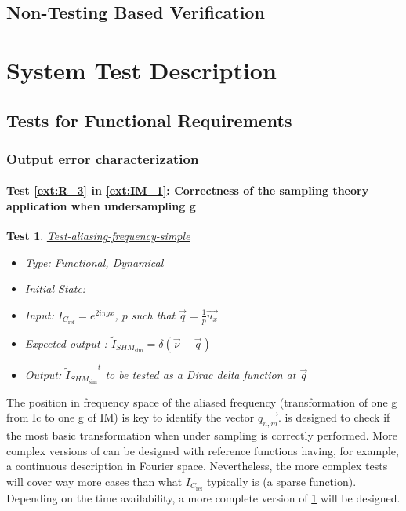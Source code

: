\documentclass[12pt, titlepage]{article}
\newtheorem{Test}{Test}
\begin{document}

\subsection{Non-Testing Based Verification}


\section{System Test Description}
	
\subsection{Tests for Functional Requirements}
\renewcommand{\labelitemi}{$\star$}

\subsubsection{Output error characterization}
	
\paragraph{Test \cref{ext:R_3} in \cref{ext:IM_1}: Correctness of the sampling theory application when undersampling g}

\begin{Test}\normalfont\underline{Test-aliasing-frequency-simple}
\label{aliasing-frequency-simple}
\begin{itemize}
\item Type: Functional, Dynamical
\item Initial State: 
\item Input: $I_{C_{\text{ref}}}=e^{2i\pi gx}$, $p$ such that $\overrightarrow{q}=\frac{1}{p}\vec{u_x}$
\item Expected output : $\widetilde{I}_{\mathit{SHM}_{\text{sim}}}=\delta(\vec{\nu}-\vec{q})$
\item Output: ${\widetilde{I}_{\mathit{SHM}_{\text{sim}}}}^{t}$ to be tested as a Dirac delta function at $\overrightarrow{q}$
\end{itemize}
\end{Test}
		
The position in frequency space of the aliased frequency (transformation of one g from Ic to one g of IM) is key to identify the vector $\overrightarrow{q_{n,m}}$.  is designed to check if the most basic transformation when under sampling is correctly performed. More complex versions of  can be designed with reference functions having, for example, a continuous description in Fourier space. Nevertheless, the more complex tests will cover way more cases than what $I_{C_{\text{ref}}}$ typically is (a sparse function). Depending on the time availability, a more complete version of \cref{aliasing-frequency-simple} will be designed.
		
\end{document}
